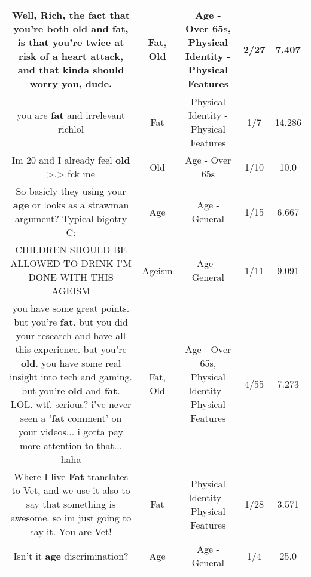 \documentclass[11pt]{article}
\newlength\mylength
\begin{document}
\begin{center}
\begin{longtable}{|C{.65\mylength}|C{.30\mylength}|C{.12\mylength}|C{.12\mylength}|C{.12\mylength}|}
  \small Well, Rich, the fact that you're both \textbf{old} and \textbf{fat}, is that you're twice at risk of a heart attack, and that kinda should worry you, dude.\normalsize   & Fat, Old & Age - Over 65s, Physical Identity - Physical Features & 2/27 & 7.407 \\  \hline
  \small you are \textbf{fat} and irrelevant richlol\normalsize   & Fat & Physical Identity - Physical Features & 1/7 & 14.286 \\  \hline
  \small Im 20 and I already feel \textbf{old} >.> fck me\normalsize   & Old & Age - Over 65s & 1/10 & 10.0 \\  \hline
  \small So basicly they using your \textbf{age} or looks as a strawman argument? Typical bigotry C:\normalsize   & Age & Age - General & 1/15 & 6.667 \\  \hline
  \small CHILDREN SHOULD BE ALLOWED TO DRINK I'M DONE WITH THIS AGEISM\normalsize   & Ageism & Age - General & 1/11 & 9.091 \\  \hline
  \small you have some great points. but you're \textbf{fat}.  but you did your research and have all this experience.  but you're \textbf{old}.  you have some real insight into tech and gaming.  but you're \textbf{old} and \textbf{fat}.  LOL. wtf. serious?  i've never seen a '\textbf{fat} comment' on your videos... i gotta pay more attention to that... haha\normalsize   & Fat, Old & Age - Over 65s, Physical Identity - Physical Features & 4/55 & 7.273 \\  \hline
  \small Where I live \textbf{Fat} translates to Vet, and we use it also to say that something is awesome. so im just going to say it. You are Vet!\normalsize   & Fat & Physical Identity - Physical Features & 1/28 & 3.571 \\  \hline
  \small Isn't it \textbf{age} discrimination?\normalsize   & Age & Age - General & 1/4 & 25.0 \\  \hline

\end{longtable}
\end{center}
\end{document}
